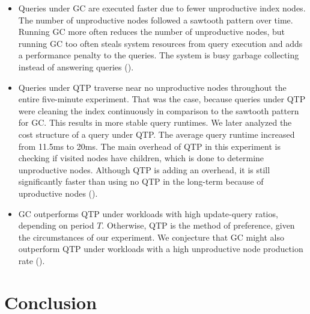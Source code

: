 \documentclass[abstracton,12pt]{scrartcl}
\theoremstyle{definition}
\begin{document}
\begin{itemize}
    \item Queries under GC are executed faster due to fewer unproductive
        index nodes. The number of unproductive nodes followed a sawtooth 
        pattern over time.
        Running GC more often reduces the number of unproductive
        nodes, but running GC too often steals system resources from query
        execution and adds a performance penalty to the queries. The
        system is busy garbage collecting instead of answering queries
        ().


    \item Queries under QTP traverse near no unproductive nodes throughout
        the entire five-minute experiment. That was the case, because queries under
        QTP were cleaning the index continuously in comparison to the
        sawtooth pattern for GC. This results in more stable query runtimes.
        We later analyzed the
        cost structure of a query under QTP. The average query runtime increased
        from 11.5ms to 20ms. The main overhead of QTP in this experiment is 
        checking if visited nodes have children, which is done to 
        determine unproductive nodes. Although QTP is adding an overhead,
        it is still significantly faster than using no QTP in the long-term
        because of uproductive nodes ().

    \item GC outperforms QTP under workloads with high update-query ratios,
        depending on period $T$. Otherwise, QTP is the method of preference,
        given the circumstances of our experiment. We conjecture that GC might
        also outperform QTP under workloads with a high unproductive node
        production rate ().

\end{itemize}

\newpage

\section{Conclusion}
\end{document}
